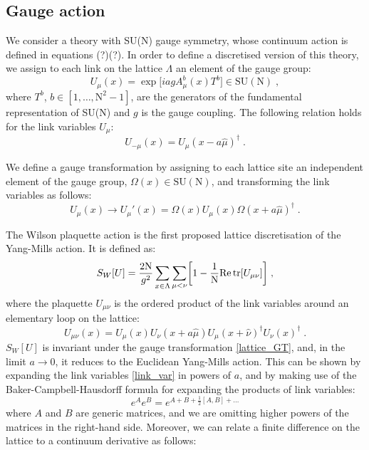 \subsection{Gauge action}

We consider a theory with SU(N) gauge symmetry, whose continuum action is defined in equations {\color{red}(?)(?)}.  In order to define a discretised version of this theory, we assign to each link on the lattice $\Lambda$ an element of the gauge group:
\begin{equation}
U_ {\mu}(x) = \exp\biggl[i a  g A^b_{\mu}(x) T^b \biggr] \in \mathrm{SU(N)} \; ,
\label{link_var}
\end{equation}
%
where $T^b$, $b \in  [1, \dots, \mathrm{N}^2 -1]$, are the generators of the fundamental representation  of  SU(N) and $g$ is the gauge coupling. The following relation holds for the link variables $U_{\mu}$:
\begin{equation}
U_{-\mu}(x)  = U_{\mu}(x - a\hat\mu)^{\dagger} \; .
\end{equation}

We define a gauge transformation by assigning to each lattice site an independent element of the gauge group, $\Omega(x) \in \mathrm{SU(N)}$,  and transforming the  link variables as follows:
\begin{equation}
U_ {\mu}(x) \to  U_{\mu}'(x) = \Omega(x) U_{\mu}(x) \Omega(x+  a \hat \mu)^{\dagger} \; .
\label{lattice_GT}
\end{equation}

The  Wilson plaquette action \cite{Wilson:1974sk} is the first proposed lattice discretisation of the  Yang-Mills action. It is defined as:
\begin{equation}
S_W[U] =  \frac{2 \mathrm N}{g^2} \sum_{x \in \Lambda}  \sum_{\mu < \nu} \biggl[  1 - \frac{1}{\mathrm{N}} \mathrm{Re} \tr  [U_{\mu \nu}] \biggr] \; ,
\end{equation}
%
where the plaquette $U_{\mu \nu}$ is the ordered product of the link variables around an elementary loop on the lattice:
\begin{equation}
U_{\mu \nu}(x)  = U_{\mu}(x) U_{\nu}(x + a\hat\mu) U_{\mu}(x+\hat\nu)^{\dagger} U_{\nu}(x) ^{\dagger}   \; .
\label{plaquette}
\end{equation}
%
$S_W[U]$ is invariant under the gauge transformation \ref{lattice_GT}, and, in the limit $a \to 0$, it reduces to the Euclidean Yang-Mills action.
This can be shown by expanding the link variables \ref{link_var} in powers of $a$, and by making use of the Baker-Campbell-Hausdorff formula for expanding the products of link variables:
\begin{equation}
e^A e^B = e^{A+B+\frac{1}{2}[A,B] + \dots}
\end{equation}
%
where $A$  and $B$ are generic matrices, and we are omitting higher powers of the matrices in the right-hand side. Moreover, we can relate a finite difference on the lattice to a continuum derivative as follows:

